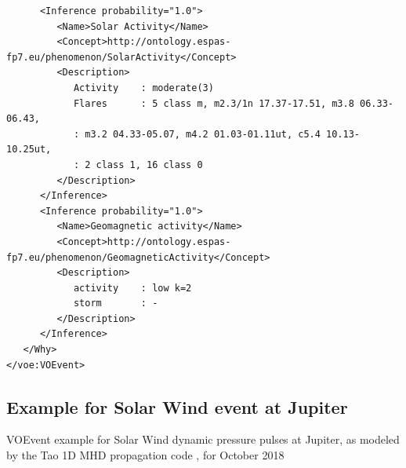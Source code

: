 \documentclass[referee,a4paper,12pt,traditabstract]{swsc}
\begin{document}
\begin{linenumbers}
{\begin{verbatim}
      <Inference probability="1.0">
         <Name>Solar Activity</Name>
         <Concept>http://ontology.espas-fp7.eu/phenomenon/SolarActivity</Concept>
         <Description>
            Activity    : moderate(3)
            Flares      : 5 class m, m2.3/1n 17.37-17.51, m3.8 06.33-06.43,
            : m3.2 04.33-05.07, m4.2 01.03-01.11ut, c5.4 10.13-10.25ut,
            : 2 class 1, 16 class 0
         </Description>
      </Inference>
      <Inference probability="1.0">
         <Name>Geomagnetic activity</Name>
         <Concept>http://ontology.espas-fp7.eu/phenomenon/GeomagneticActivity</Concept>
         <Description>
            activity    : low k=2
            storm       : -
         </Description>
      </Inference>
   </Why>
</voe:VOEvent>
\end{verbatim}
}

\subsection{Example for Solar Wind event at Jupiter}
\label{appendix-xml-voevent-tao}
VOEvent example for Solar Wind dynamic pressure pulses at Jupiter, as modeled by the Tao 1D MHD propagation code \cite{Tao:2005dp}, for October 2018


\end{linenumbers}
\end{document}
